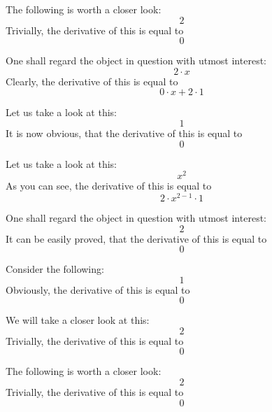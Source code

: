 \documentclass{article}
\begin{document}
The following is worth a closer look:
\begin{equation}
2 
\end{equation}
Trivially, the derivative of this is equal to
\begin{equation}
0 
\end{equation}

One shall regard the object in question with utmost interest:
\begin{equation}
2 \cdot x 
\end{equation}
Clearly, the derivative of this is equal to
\begin{equation}
0 \cdot x + 2 \cdot 1 
\end{equation}

Let us take a look at this:
\begin{equation}
1 
\end{equation}
It is now obvious, that the derivative of this is equal to
\begin{equation}
0 
\end{equation}

Let us take a look at this:
\begin{equation}
x ^{2 } 
\end{equation}
As you can see, the derivative of this is equal to
\begin{equation}
2 \cdot x ^{2 - 1 } \cdot 1 
\end{equation}

One shall regard the object in question with utmost interest:
\begin{equation}
2 
\end{equation}
It can be easily proved, that the derivative of this is equal to
\begin{equation}
0 
\end{equation}

Consider the following:
\begin{equation}
1 
\end{equation}
Obviously, the derivative of this is equal to
\begin{equation}
0 
\end{equation}

We will take a closer look at this:
\begin{equation}
2 
\end{equation}
Trivially, the derivative of this is equal to
\begin{equation}
0 
\end{equation}

The following is worth a closer look:
\begin{equation}
2 
\end{equation}
Trivially, the derivative of this is equal to
\begin{equation}
0 
\end{equation}
\end{document}

